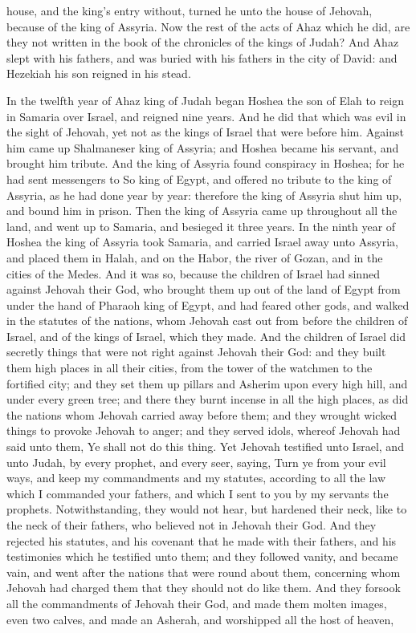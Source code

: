 house, and the king’s entry without, turned he unto the house of Jehovah, because of the king of Assyria. Now the rest of the acts of Ahaz which he did, are they not written in the book of the chronicles of the kings of Judah? And Ahaz slept with his fathers, and was buried with his fathers in the city of David: and Hezekiah his son reigned in his stead. 

In the twelfth year of Ahaz king of Judah began Hoshea the son of Elah to reign in Samaria over Israel, and reigned nine years. And he did that which was evil in the sight of Jehovah, yet not as the kings of Israel that were before him. Against him came up Shalmaneser king of Assyria; and Hoshea became his servant, and brought him tribute. And the king of Assyria found conspiracy in Hoshea; for he had sent messengers to So king of Egypt, and offered no tribute to the king of Assyria, as he had done year by year: therefore the king of Assyria shut him up, and bound him in prison. Then the king of Assyria came up throughout all the land, and went up to Samaria, and besieged it three years. In the ninth year of Hoshea the king of Assyria took Samaria, and carried Israel away unto Assyria, and placed them in Halah, and on the Habor, the river of Gozan, and in the cities of the Medes.  And it was so, because the children of Israel had sinned against Jehovah their God, who brought them up out of the land of Egypt from under the hand of Pharaoh king of Egypt, and had feared other gods, and walked in the statutes of the nations, whom Jehovah cast out from before the children of Israel, and of the kings of Israel, which they made. And the children of Israel did secretly things that were not right against Jehovah their God: and they built them high places in all their cities, from the tower of the watchmen to the fortified city; and they set them up pillars and Asherim upon every high hill, and under every green tree; and there they burnt incense in all the high places, as did the nations whom Jehovah carried away before them; and they wrought wicked things to provoke Jehovah to anger; and they served idols, whereof Jehovah had said unto them, Ye shall not do this thing. Yet Jehovah testified unto Israel, and unto Judah, by every prophet, and every seer, saying, Turn ye from your evil ways, and keep my commandments and my statutes, according to all the law which I commanded your fathers, and which I sent to you by my servants the prophets. Notwithstanding, they would not hear, but hardened their neck, like to the neck of their fathers, who believed not in Jehovah their God. And they rejected his statutes, and his covenant that he made with their fathers, and his testimonies which he testified unto them; and they followed vanity, and became vain, and went after the nations that were round about them, concerning whom Jehovah had charged them that they should not do like them. And they forsook all the commandments of Jehovah their God, and made them molten images, even two calves, and made an Asherah, and worshipped all the host of heaven, 